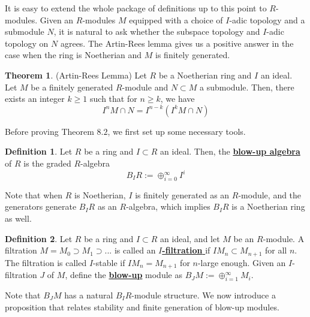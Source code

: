 \documentclass{article}
\theoremstyle{definition}
\newtheorem{theorem}{Theorem}[section]
\theoremstyle{definition}
\theoremstyle{definition}
\theoremstyle{definition}
\theoremstyle{definition}
\newtheorem{definition}{Definition}[section]
\theoremstyle{definition}
\theoremstyle{definition}
\begin{document}
It is easy to extend the whole package of definitions up to this point to $R$-modules. Given an $R$-modules $M$ equipped with a choice of $I$-adic topology and a submodule $N$, it is natural to ask whether the subspace topology and $I$-adic topology on $N$ agrees. The Artin-Rees lemma gives us a positive answer in the case when the ring is Noetherian and $M$ is finitely generated. 


\begin{tcolorbox}[colback=red!5!white,colframe=red!30!white]
\begin{theorem}
(Artin-Rees Lemma) Let $R$ be a Noetherian ring and $I$ an ideal. Let $M$ be a finitely generated $R$-module and $N\subset M$ a submodule. Then, there exists an integer $k\geq 1$ such that for $n\geq k$, we have 
\[I^nM\cap N=I^{n-k}(I^kM\cap N)\]
\end{theorem}
\end{tcolorbox}

Before proving Theorem $8.2$, we first set up some necessary tools. 


\begin{tcolorbox}[colback=purple!5!white,colframe=purple!75!black]
\begin{definition}
Let $R$ be a ring and $I\subset R$ an ideal. Then, the \underline{\textbf{blow-up algebra}} of $R$ is the graded $R$-algebra
\[B_IR:=\oplus_{i=0} ^{\infty} I^i\]
\end{definition}
\end{tcolorbox}
Note that when $R$ is Noetherian, $I$ is finitely generated as an $R$-module, and the generators generate $B_IR$ as an $R$-algebra, which implies $B_IR$ is a Noetherian ring as well. 



\begin{tcolorbox}[colback=purple!5!white,colframe=purple!75!black]
\begin{definition}
Let $R$ be a ring and $I\subset R$ an ideal, and let $M$ be an $R$-module. A filtration $M=M_0\supset M_1\supset...$ is called an $I$\underline{\textbf{-filtration }} if $IM_n\subset M_{n+1}$ for all $n$. The filtration is called $I$-stable if $IM_n=M_{n+1}$ for $n$-large enough. Given an $I$-filtration $J$ of $M$, define the \underline{\textbf{blow-up}} module as $B_JM:=\oplus_{i=1}^{\infty}M_i$.
\end{definition}
\end{tcolorbox}
Note that $B_JM$ has a natural $B_IR$-module structure. We now introduce a proposition that relates stability and finite generation of blow-up modules. 
\end{document}
